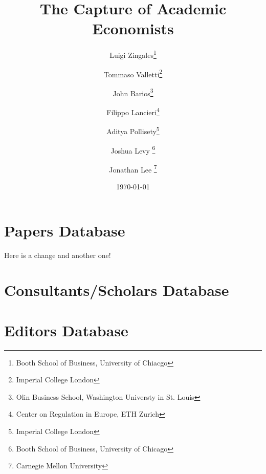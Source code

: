 \documentclass[11pt, letterpaper, twoside]{article}
\title{\singlespacing\textbf{The Capture of Academic Economists}}
\author{
    Luigi Zingales\thanks{Booth School of Business, University of Chiacgo} \\
    \and
    Tommaso Valletti\thanks{Imperial College London}\\
    \and
    John Barios\thanks{Olin Business School, Washington Universty in St. Louis}\\
    \and
    Filippo Lancieri\thanks{Center on Regulation in Europe, ETH Zurich} \\
    \and
    Aditya Pollisety\thanks{Imperial College London}\\
    \and
    Joshua Levy \thanks{Booth School of Business, University of Chicago}\\
    \and
    Jonathan Lee \thanks{Carnegie Mellon University}
    }
\date{\today}
\begin{document}
\begin{titlepage}
    \maketitle
    \thispagestyle{empty}
\end{titlepage}


\newpage
{}

\section{Papers Database}


Here is a change and another one!




\section{Consultants/Scholars Database}


\section{Editors Database}
\end{document}
